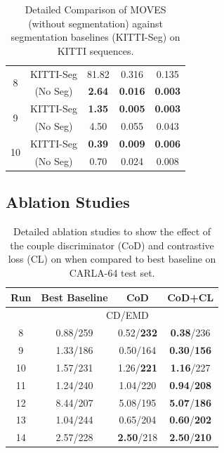 \begin{table}[H]
\begin{tabular}{|c|c|c|c|c|}
\multirow{2}{*}{8}  

& KITTI-Seg            &       81.82          &   0.316          & 0.135          \\  
& \dslruda{} (No Seg)              & \textbf{2.64}           & \textbf{0.016} &         \textbf{0.003} \\\hline

\multirow{2}{*}{9} 
& KITTI-Seg            &       \textbf{1.35}         & \textbf{0.005}          & \textbf{0.003}          \\  
& \dslruda{} (No Seg)              & 4.50       & 0.055 &    0.043 \\\hline
\multirow{2}{*}{10}
& KITTI-Seg            &     \textbf{0.39}          & \textbf{0.009}           & \textbf{0.006}          \\  
& \dslruda{} (No Seg)              & 0.70   & 0.024 & 0.008 \\\hline
\end{tabular}
\caption{Detailed Comparison of MOVES (without segmentation) against segmentation baselines (KITTI-Seg) on KITTI sequences.}
\label{tab:kitti-seg-all}
\end{table}




\subsection{Ablation Studies}
\label{sec:ablation}

 \begin{table}[h]
 \scriptsize
    \centering
    \begin{tabular}{|c|c|c|c|}
    \hline
    Run & Best Baseline & CoD & CoD+CL \\ \hline
    & \multicolumn{3}{|c|}{{CD/EMD}}      \\ \hline

    8   & 0.88/259 & 0.52/\textbf{232}   & \textbf{0.38}/236  \\ \hline
    9   & 1.33/186  & 0.50/164  & \textbf{0.30}/\textbf{156}\\\hline

    10  & 1.57/231 & 1.26/\textbf{221}   &  \textbf{1.16}/227 \\ \hline
    11  & 1.24/240 & 1.04/220   & \textbf{0.94}/\textbf{208} \\ \hline
    12  & 8.44/207 & 5.08/195   & \textbf{5.07}/\textbf{186}  \\ \hline
    13  & 1.04/244 & 0.65/204   & \textbf{0.60}/\textbf{202}  \\ \hline 
    14  & 2.57/228 & \textbf{2.50}/218 & \textbf{2.50}/\textbf{210}\\ \hline 
    \end{tabular}
    \caption{Detailed ablation studies to show the effect of the couple discriminator (CoD) and contrastive loss (CL) on \dslr{} when compared to best baseline on CARLA-64 test set.}
    \label{tab:ablation}
    \end{table}






